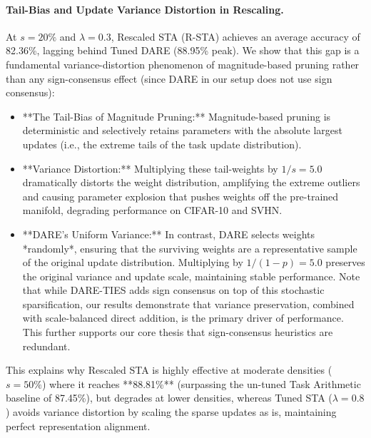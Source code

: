 \paragraph{Tail-Bias and Update Variance Distortion in Rescaling.}
At $s=20\%$ and $\lambda=0.3$, Rescaled STA (R-STA) achieves an average accuracy of 82.36\%, lagging behind Tuned DARE (88.95\% peak). We show that this gap is a fundamental variance-distortion phenomenon of magnitude-based pruning rather than any sign-consensus effect (since DARE in our setup does not use sign consensus):
\begin{itemize}
    \item **The Tail-Bias of Magnitude Pruning:** Magnitude-based pruning is deterministic and selectively retains parameters with the absolute largest updates (i.e., the extreme tails of the task update distribution).
    \item **Variance Distortion:** Multiplying these tail-weights by $1/s = 5.0$ dramatically distorts the weight distribution, amplifying the extreme outliers and causing parameter explosion that pushes weights off the pre-trained manifold, degrading performance on CIFAR-10 and SVHN.
    \item **DARE's Uniform Variance:** In contrast, DARE selects weights *randomly*, ensuring that the surviving weights are a representative sample of the original update distribution. Multiplying by $1/(1-p) = 5.0$ preserves the original variance and update scale, maintaining stable performance. Note that while DARE-TIES adds sign consensus on top of this stochastic sparsification, our results demonstrate that variance preservation, combined with scale-balanced direct addition, is the primary driver of performance. This further supports our core thesis that sign-consensus heuristics are redundant.
\end{itemize}
This explains why Rescaled STA is highly effective at moderate densities ($s=50\%$) where it reaches **88.81\%** (surpassing the un-tuned Task Arithmetic baseline of 87.45\%), but degrades at lower densities, whereas Tuned STA ($\lambda=0.8$) avoids variance distortion by scaling the sparse updates as is, maintaining perfect representation alignment.
